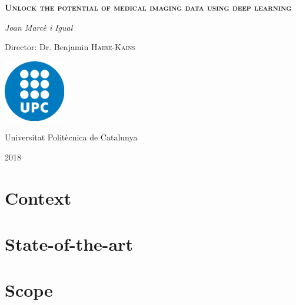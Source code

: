 \documentclass[a4paper]{article}
\begin{document}
\begin{titlepage}
    \centering
	\vspace{1.5cm}
	{\huge \textbf{\textsc{Unlock the potential of medical imaging data using deep learning}} \par}
	\vspace{2cm}
	{\Large\itshape Joan Marcè i Igual\par}
	\vfill
    Director: Dr. Benjamin \textsc{Haibe-Kains}
    
    \vfill

    \includegraphics[width=0.2\textwidth]{images/logo_upc}\par\vspace{1cm}
	\vfill
    
    {\LARGE Universitat Politècnica de Catalunya \par}
    {\LARGE 2018 \par}
\end{titlepage}

\tableofcontents

\section{Context}

\section{State-of-the-art}

\section{Scope}
\end{document}
